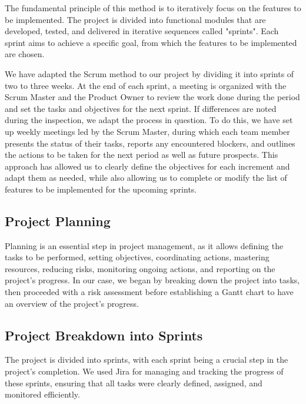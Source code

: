 The fundamental principle of this method is to iteratively focus on the features to be implemented. The project is divided into functional modules that are developed, tested, and delivered in iterative sequences called "sprints". Each sprint aims to achieve a specific goal, from which the features to be implemented are chosen.

We have adapted the Scrum method to our project by dividing it into sprints of two to three weeks. At the end of each sprint, a meeting is organized with the Scrum Master and the Product Owner to review the work done during the period and set the tasks and objectives for the next sprint. If differences are noted during the inspection, we adapt the process in question. To do this, we have set up weekly meetings led by the Scrum Master, during which each team member presents the status of their tasks, reports any encountered blockers, and outlines the actions to be taken for the next period as well as future prospects. This approach has allowed us to clearly define the objectives for each increment and adapt them as needed, while also allowing us to complete or modify the list of features to be implemented for the upcoming sprints.

\subsection{Project Planning}
Planning is an essential step in project management, as it allows defining the tasks to be performed, setting objectives, coordinating actions, mastering resources, reducing risks, monitoring ongoing actions, and reporting on the project's progress. In our case, we began by breaking down the project into tasks, then proceeded with a risk assessment before establishing a Gantt chart to have an overview of the project's progress.

\subsection{Project Breakdown into Sprints}

The project is divided into sprints, with each sprint being a crucial step in the project’s completion. We used Jira for managing and tracking the progress of these sprints, ensuring that all tasks were clearly defined, assigned, and monitored efficiently.

